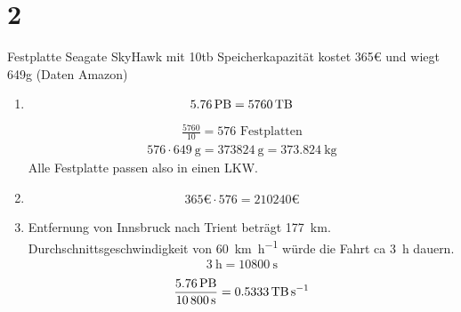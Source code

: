 \documentclass[ngerman]{scrartcl}
\begin{document}
\section*{2}
	Festplatte Seagate SkyHawk mit 10tb Speicherkapazität kostet 365€ und wiegt 649g (Daten Amazon)
	\begin{enumerate}[label=\alph*)]
		\item 
		\begin{align*}
			\SI{5,76}{\peta\byte} = \SI{5760}{\tera\byte}
		\end{align*}
		\begin{align*}
			\frac{5760}{10} = 576 \text{ Festplatten}
		\end{align*}
		\begin{align*}
			576 \cdot \SI{649}{\gram} = \SI{373824}{\gram} = \SI{373,824}{\kilogram}
		\end{align*}
		Alle Festplatte passen also in einen LKW.
		
		\item 
		\begin{align*}
			365 \euro \cdot 576 = 210240\euro
		\end{align*}
				
		\item 
		Entfernung von Innsbruck nach Trient beträgt \SI{177}{\kilo\metre}. Durchschnittsgeschwindigkeit von \SI{60}{\kilo\metre\per\hour} würde die Fahrt ca \SI{3}{\hour} dauern. 
		\begin{align*}
			\SI{3}{\hour} = \SI{10800}{\second}			
		\end{align*}
		\begin{align*}
			\frac{\SI{5,76}{\peta\byte}}{\SI{10800}{\second}} = \SI{0,5333}{\tera\byte\per\second}		
		\end{align*}
	\end{enumerate}
\end{document}
